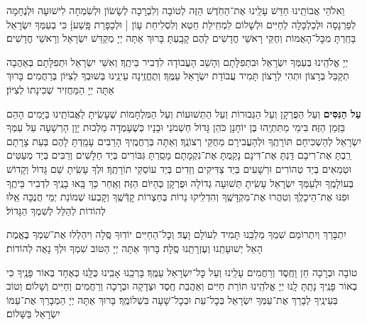 \documentclass[twoside, openany, parskip=half, 11pt]{book}
\begin{document}
וֵאלֹהֵי אֲבוֹתֵֽינוּ חַדֵּשׁ עָלֵֽינוּ אֶת־הַחֹֽדֶשׁ הַזֶּה לְטוֹבָה וְלִבְרָכָה לְשָׂשׂוֹן וּלְשִׂמְחָה לִישׁוּעָה וּלְנֶחָמָה לְפַרְנָסָה וּלְכַלְכָּלָה לְחַיִּים וּלְשָׁלוֹם לִמְחִֽילַת חֵטְא וְלִסְלִיחַת עָוֹן [
וּלְכַפָּרַת פָּֽשַׁע]׃ כִּי בְעַמְּךָ יִשְׂרָאֵל בָּחַֽרְתָּ מִכׇּל־הָאֻמּוֹת וְחֻקֵּי רָאשֵׁי חֳדָשִׁים לָהֶם קָבָֽעְתָּ׃ בָּרוּךְ אַתָּה יְיָ מְקַדֵּשׁ יִשְׂרָאֵל וְרָאשֵׁי חֳדָשִׁים׃

יְיָ אֱלֹהֵֽינוּ בְּעַמְּךָ יִשְׂרָאֵל וּבִתְפִלָּתָם וְהָשֵׁב הָעֲבוֹדָה לִדְבִיר בֵּיתֶֽךָ׃ וְאִשֵּׁי יִשְׂרָאֵל וּתְפִלָּתָם בְּאַהֲבָה תְקַבֵּל בְּרָצוֹן וּתְהִי לְרָצוֹן תָּמִיד עֲבוֹדַת יִשְׂרָאֵל עַמֶּֽךָ׃ וְתֶחֱזֶֽינָה עֵינֵֽינוּ בְּשׁוּבְךָ לְצִיּוֹן בְּרַחֲמִים׃ בָּרוּךְ אַתָּה יְיָ הַמַּחֲזִיר שְׁכִינָתוֹ לְצִיּוֹן׃

\modim

\enlargethispage{\baselineskip}

\begin{sometimes}

\textbf{עַל הַנִּסִּים}
וְעַל הַפֻּרְקָן וְעַל הַגְּבוּרוֹת וְעַל הַתְּשׁוּעוֹת וְעַל הַמִּלְחָמוֹת
שֶׁעָשִֽׂיתָ לַאֲבוֹתֵֽינוּ בַּיָּמִים הָהֵם בַּזְּמַן הַזֶּה׃
בִּימֵי מַתִּתְיָֽהוּ בֶּן יוֹחָנָן כֹּהֵן גָּדוֹל חַשְׁמֹנַי וּבָנָיו כְּשֶׁעָמְדָה מַלְכוּת יָוָן הָרְשָׁעָה עַל עַמְּךָ יִשְׂרָאֵל לְהַשְׁכִּיחָם תּוֹרָתֶֽךָ וּלְהַעֲבִירָם מֵחֻקֵּי רְצוֹנֶֽךָ׃ וְאַתָּה בְּרַחֲמֶֽיךָ הָרַבִּים עָמַֽדְתָּ לָהֶם בְּעֵת צָרָתָם רַֽבְתָּ אֶת־רִיבָם דַּֽנְתָּ אֶת־דִּינָם נָקַֽמְתָּ אֶת־נִקְמָתָם׃ מָסַֽרְתָּ גִּבּוֹרִים בְּיַד חַלָּשִׁים וְרַבִּים בְּיַד מְעַטִּים וּטְמֵאִים בְּיַד טְהוֹרִים וּרְשָׁעִים בְּיַד צַדִּיקִים וְזֵדִים בְּיַד עוֹסְקֵי תוֹרָתֶֽךָ׃ וּלְךָ עָשִֽׂיתָ שֵׁם גָּדוֹל וְקָדוֹשׁ בְּעוֹלָמֶֽךָ וּלְעַמְּךָ יִשְׂרָאֵל עָשִֽׂיתָ תְּשׁוּעָה גְדוֹלָה וּפֻרְקָן כְּהַיּוֹם הַזֶּה׃ וְאַֽחַר כַּךְ בָּֽאוּ בָנֶֽיךָ לִדְבִיר בֵּיתֶֽךָ וּפִנּוּ אֶת־הֵיכָלֶֽךָ וְטִהֲרוּ אֶת־מִקְדָּשֶֽׁךָ וְהִדְלִֽיקוּ נֵרוֹת בְּחַצְרוֹת קׇדְּֿשֶֽׁךָ וְקָבְעוּ שְׁמוֹנַת יְמֵי חֲנֻכָּה אֵֽלּוּ לְהוֹדוֹת לְהַלֵּל לְשִׁמְךָ הַגָּדוֹל׃

\end{sometimes}

יִתְבָּרַךְ וְיִתְרוֹמַם שִׁמְךָ מַלְכֵּֽנוּ תָּמִיד לְעוֹלָם וָעֶד׃
וְכׇל־הַחַיִּים יוֹדֽוּךָ סֶּֽלָה וִיהַלְלוּ אֶת־שִׁמְךָ בֶּאֱמֶת הָאֵל יְשׁוּעָתֵֽנוּ וְעֶזְרָתֵֽנוּ סֶֽלָה׃ בָּרוּךְ אַתָּה יְיָ הַטּוֹב שִׁמְךָ וּלְךָ נָאֶה לְהוֹדוֹת׃

\shatzbrikaskohanim

טוֹבָה וּבְרָכָה חֵן וָחֶֽסֶד וְרַחֲמִים עָלֵֽינוּ וְעַל כׇּל־יִשְׂרָאֵל עַמֶּֽךָ׃ בָּרְכֵֽנוּ אָבִֽינוּ כֻּלָּֽנוּ כְּאֶחָד בְּאוֹר פָּנֶֽיךָ כִּי בְאוֹר פָּנֶֽיךָ נָתַֽתָּ לָֽנוּ יְיָ אֱלֹהֵֽינוּ תּוֹרַת חַיִּים וְאַהֲבַת חֶֽסֶד וּצְדָקָה וּבְרָכָה וְרַחֲמִים וְחַיִּים וְשָׁלוֹם׃ וְטוֹב בְּעֵינֶֽיךָ לְבָרֵךְ אֶת־עַמְּךָ יִשְׂרָאֵל בְּכׇל־עֵת וּבְכׇל־שָׁעָה בִּשְׁלוֹמֶֽךָ׃ בָּרוּךְ אַתָּה יְיָ הַמְבָרֵךְ אֶת־עַמּוֹ יִשְׂרָאֵל בַּשָּׁלוֹם׃
\end{document}
